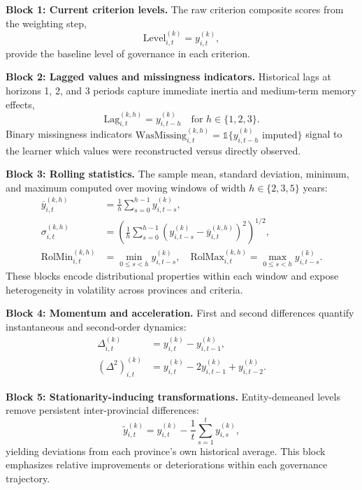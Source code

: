 \documentclass[12pt,a4paper]{article}
\begin{document}
\textbf{Block 1: Current criterion levels.} The raw criterion composite scores from the weighting step,
\begin{equation}
\text{Level}_{i,t}^{(k)} = y_{i,t}^{(k)},
\end{equation}
provide the baseline level of governance in each criterion.

\textbf{Block 2: Lagged values and missingness indicators.} Historical lags at horizons 1, 2, and 3 periods capture immediate inertia and medium-term memory effects,
\begin{equation}
\text{Lag}_{i,t}^{(k,h)} = y_{i,t-h}^{(k)} \quad \text{for } h \in \{1, 2, 3\}.
\end{equation}
Binary missingness indicators $\text{WasMissing}_{i,t}^{(k,h)} = \mathbb{1}\{ y_{i,t-h}^{(k)} \text{ imputed} \}$ signal to the learner which values were reconstructed versus directly observed.

\textbf{Block 3: Rolling statistics.} The sample mean, standard deviation, minimum, and maximum computed over moving windows of width $h \in \{2, 3, 5\}$ years:
\begin{align}
\overline{y}_{i,t}^{(k,h)} &= \frac{1}{h} \sum_{s=0}^{h-1} y_{i,t-s}^{(k)}, \\
\sigma_{i,t}^{(k,h)} &= \left( \frac{1}{h} \sum_{s=0}^{h-1} (y_{i,t-s}^{(k)} - \overline{y}_{i,t}^{(k,h)})^2 \right)^{1/2}, \\
\text{RolMin}_{i,t}^{(k,h)} &= \min_{0 \le s < h} y_{i,t-s}^{(k)}, \quad
\text{RolMax}_{i,t}^{(k,h)} = \max_{0 \le s < h} y_{i,t-s}^{(k)}.
\end{align}
These blocks encode distributional properties within each window and expose heterogeneity in volatility across provinces and criteria.

\textbf{Block 4: Momentum and acceleration.} First and second differences quantify instantaneous and second-order dynamics:
\begin{align}
\Delta_{i,t}^{(k)} &= y_{i,t}^{(k)} - y_{i,t-1}^{(k)}, \\
(\Delta^2)_{i,t}^{(k)} &= y_{i,t}^{(k)} - 2 y_{i,t-1}^{(k)} + y_{i,t-2}^{(k)}.
\end{align}

\textbf{Block 5: Stationarity-inducing transformations.} Entity-demeaned levels remove persistent inter-provincial differences:
\begin{equation}
\tilde{y}_{i,t}^{(k)} = y_{i,t}^{(k)} - \frac{1}{t} \sum_{s=1}^{t} y_{i,s}^{(k)},
\end{equation}
yielding deviations from each province's own historical average. This block emphasizes relative improvements or deteriorations within each governance trajectory.
\end{document}
